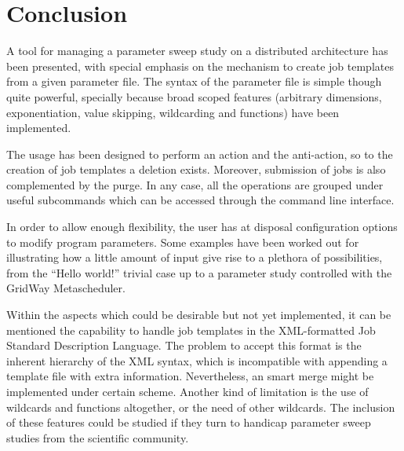 \documentclass[12pt,a4paper]{article}
\newenvironment{term}{\endgraf\scriptsize\noindent\verbatim}{\endverbatim}
\begin{document}

\section{Conclusion}\label{conclusion}
A tool for managing a parameter sweep study on a distributed architecture has been presented, with special emphasis on the mechanism to create job templates from a given parameter file. The syntax of the parameter file is simple though quite powerful, specially because broad scoped features (arbitrary dimensions, exponentiation, value skipping, wildcarding and functions) have been implemented.

The usage has been designed to perform an action and the anti-action, so to the creation of job templates a deletion exists. Moreover, submission of jobs is also complemented by the purge. In any case, all the operations are grouped under useful subcommands which can be accessed through the command line interface.

In order to allow enough flexibility, the user has at disposal configuration options to modify program parameters. Some examples have been worked out for illustrating how a little amount of input give rise to a plethora of possibilities, from the ``Hello world!'' trivial case up to a  parameter study controlled with the GridWay Metascheduler.

Within the aspects which could be desirable but not yet implemented, it can be mentioned the capability to handle job templates in the XML-formatted Job Standard Description Language. The problem to accept this format is the inherent hierarchy of the XML syntax, which is incompatible with appending a template file with extra information. Nevertheless, an smart merge might be implemented under certain scheme. Another kind of limitation is the use of wildcards and functions altogether, or the need of other wildcards. The inclusion of these features could be studied if they turn to handicap parameter sweep studies from the scientific community.
\end{document}
